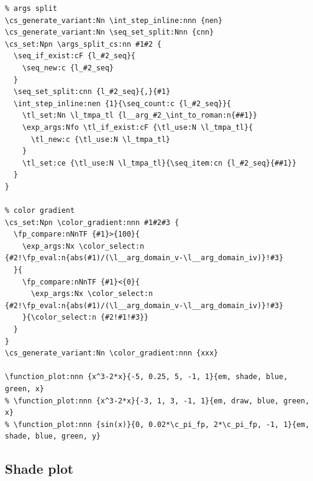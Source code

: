 \documentclass{article}
\begin{document}
{\begin{framed}
\begin{verbatim}
% args split 
\cs_generate_variant:Nn \int_step_inline:nnn {nen}
\cs_generate_variant:Nn \seq_set_split:Nnn {cnn}
\cs_set:Npn \args_split_cs:nn #1#2 {
  \seq_if_exist:cF {l_#2_seq}{
    \seq_new:c {l_#2_seq}
  }
  \seq_set_split:cnn {l_#2_seq}{,}{#1}
  \int_step_inline:nen {1}{\seq_count:c {l_#2_seq}}{
    \tl_set:Nn \l_tmpa_tl {l__arg_#2_\int_to_roman:n{##1}}
    \exp_args:Nfo \tl_if_exist:cF {\tl_use:N \l_tmpa_tl}{
      \tl_new:c {\tl_use:N \l_tmpa_tl}
    }
    \tl_set:ce {\tl_use:N \l_tmpa_tl}{\seq_item:cn {l_#2_seq}{##1}}
  }
}

% color gradient
\cs_set:Npn \color_gradient:nnn #1#2#3 {
  \fp_compare:nNnTF {#1}>{100}{
    \exp_args:Nx \color_select:n {#2!\fp_eval:n{abs(#1)/(\l__arg_domain_v-\l__arg_domain_iv)}!#3} 
  }{
    \fp_compare:nNnTF {#1}<{0}{
      \exp_args:Nx \color_select:n {#2!\fp_eval:n{abs(#1)/(\l__arg_domain_v-\l__arg_domain_iv)}!#3} 
    }{\color_select:n {#2!#1!#3}}
  }
}
\cs_generate_variant:Nn \color_gradient:nnn {xxx}

\function_plot:nnn {x^3-2*x}{-5, 0.25, 5, -1, 1}{em, shade, blue, green, x}
% \function_plot:nnn {x^3-2*x}{-3, 1, 3, -1, 1}{em, draw, blue, green, x}
% \function_plot:nnn {sin(x)}{0, 0.02*\c_pi_fp, 2*\c_pi_fp, -1, 1}{em, shade, blue, green, y}
\end{verbatim}
\end{framed}
}


\subsection{Shade plot}
\end{document}
